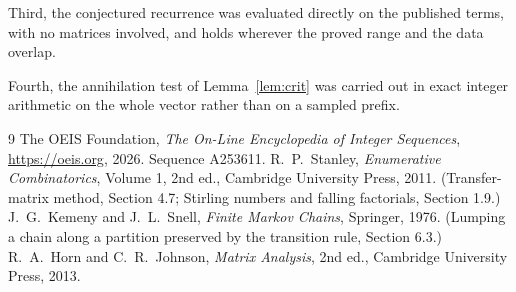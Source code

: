 \documentclass[11pt,a4paper]{article}
\theoremstyle{plain}
\theoremstyle{definition}
\begin{document}
Third, the conjectured recurrence was evaluated directly on the published terms, with no
matrices involved, and holds wherever the proved range and the data overlap.

Fourth, the annihilation test of Lemma~\ref{lem:crit} was carried out in exact integer
arithmetic on the whole vector rather than on a sampled prefix.

\begin{thebibliography}{9}
 The OEIS Foundation, \emph{The On-Line Encyclopedia of Integer
Sequences}, \url{https://oeis.org}, 2026. Sequence A253611.
 R.~P.~Stanley, \emph{Enumerative Combinatorics}, Volume 1, 2nd ed.,
Cambridge University Press, 2011. (Transfer-matrix method, Section 4.7; Stirling numbers and
falling factorials, Section 1.9.)
 J.~G.~Kemeny and J.~L.~Snell, \emph{Finite Markov Chains}, Springer,
1976. (Lumping a chain along a partition preserved by the transition rule, Section 6.3.)
 R.~A.~Horn and C.~R.~Johnson, \emph{Matrix Analysis}, 2nd ed., Cambridge
University Press, 2013.
\end{thebibliography}
\end{document}
